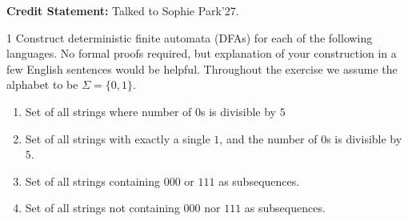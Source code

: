 \documentclass[12pt]{article}
\begin{document}


\vspace{.1in}

\textbf{Credit Statement:} Talked to Sophie Park'27. 

\begin{problem}{1}
    Construct deterministic finite automata (DFAs) for each of the following languages. No formal proofs required, but explanation of your construction in a few English sentences would be helpful. Throughout the exercise we assume the alphabet to be $\Sigma = \{0,1\}$.
    \begin{enumerate}
        \item Set of all strings where number of $0$s is divisible by $5$ 
        \item Set of all strings with exactly a single $1$, and the number of $0$s is divisible by $5$.
        \item Set of all strings containing $000$ or $111$ as subsequences. 
        \item Set of all strings not containing $000$ nor $111$ as subsequences. 
    \end{enumerate}
\end{problem}
\end{document}
